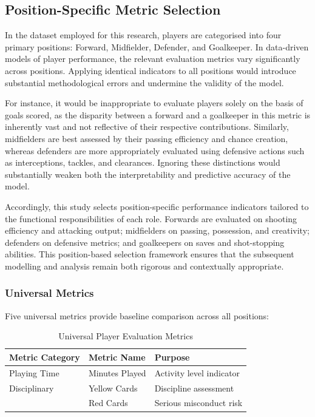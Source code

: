 \subsection{Position-Specific Metric Selection}

In the dataset employed for this research, players are categorised into four primary positions: Forward, Midfielder, Defender, and Goalkeeper. In data-driven models of player performance, the relevant evaluation metrics vary significantly across positions. Applying identical indicators to all positions would introduce substantial methodological errors and undermine the validity of the model.

For instance, it would be inappropriate to evaluate players solely on the basis of goals scored, as the disparity between a forward and a goalkeeper in this metric is inherently vast and not reflective of their respective contributions. Similarly, midfielders are best assessed by their passing efficiency and chance creation, whereas defenders are more appropriately evaluated using defensive actions such as interceptions, tackles, and clearances. Ignoring these distinctions would substantially weaken both the interpretability and predictive accuracy of the model.

Accordingly, this study selects position-specific performance indicators tailored to the functional responsibilities of each role. Forwards are evaluated on shooting efficiency and attacking output; midfielders on passing, possession, and creativity; defenders on defensive metrics; and goalkeepers on saves and shot-stopping abilities. This position-based selection framework ensures that the subsequent modelling and analysis remain both rigorous and contextually appropriate.

\subsubsection{Universal Metrics}

Five universal metrics provide baseline comparison across all positions:

\begin{table}[H]
\centering
\caption{Universal Player Evaluation Metrics}
\label{tab:universal_metrics}
\begin{tabular}{lll}
\toprule
\textbf{Metric Category} & \textbf{Metric Name} & \textbf{Purpose} \\
\midrule
Playing Time & Minutes Played & Activity level indicator \\
Disciplinary & Yellow Cards & Discipline assessment \\
 & Red Cards & Serious misconduct risk \\
\bottomrule
\end{tabular}
\end{table}

